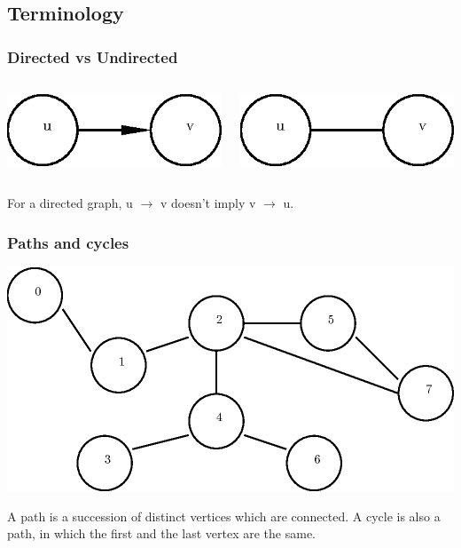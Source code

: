 \documentclass[article]{beamer}
\begin{document}
\subsection{Terminology}
\begin{frame}
	\frametitle{Directed vs Undirected}
	\begin{columns}
			\begin{center}
		\includegraphics[scale=0.8]{./figures/directed.eps}
		\end{center}
			\begin{center}
			\includegraphics[scale=0.8]{./figures/undirected.eps}
			\end{center}
	\end{columns}
	
	\vspace{14mm}
	
	\begin{flushright} 
	For a directed graph, u $\rightarrow$ v doesn't imply v $\rightarrow$ u.
	\end{flushright}
\end{frame}

\begin{frame}
	\frametitle{Paths and cycles}
	\begin{center}
			\includegraphics[scale=0.6]{./figures/path_cycle.eps}
	\end{center}
	
	\vspace{8mm}
	
	A path is a succession of distinct vertices which are connected. A cycle is also a path, in which the first and the last vertex are the same. 
\end{frame}
\end{document}
